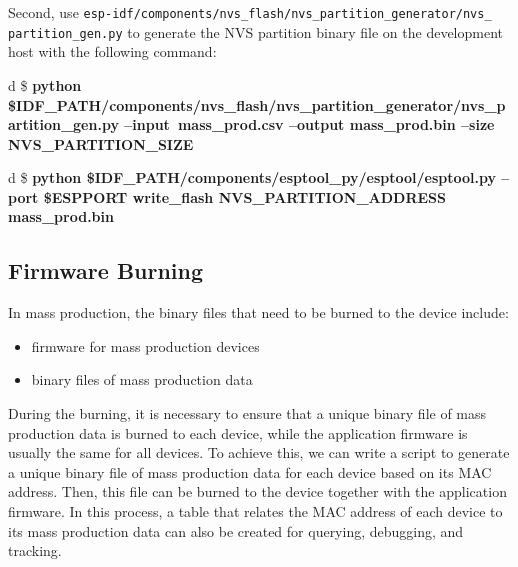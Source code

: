 \documentclass[a4paper,12pt]{book}
\begin{document}
Second, use \texttt{esp-idf/components/nvs\_flash/nvs\_partition\_generator/nvs\_\\
partition\_gen.py} to generate the NVS partition binary file on the development host with the following command:

\begin{codebloc}
\begin{tabular}{d}
\$ \bfseries python \$IDF\_PATH/components/nvs\_flash/nvs\_partition\_generator/nvs\_partition\_\newline gen.py --input\ mass\_prod.csv --output mass\_prod.bin --size NVS\_PARTITION\_SIZE
\end{tabular}
\end{codebloc}


\begin{codebloc}
\begin{tabular}{d}
\$ \bfseries python \$IDF\_PATH/components/esptool\_py/esptool/esptool.py --port \$ESPPORT write\_flash NVS\_PARTITION\_ADDRESS mass\_prod.bin
\end{tabular}
\end{codebloc}


\subsection{Firmware Burning}

In mass production, the binary files that need to be burned to the device include:

\begin{itemize}
    \leftskip 1em
    \item firmware for mass production devices
    \setlength{\parskip}{0pt}
    \item binary files of mass production data
\end{itemize}

During the burning, it is necessary to ensure that a unique binary file of mass production data is burned to each device, while the application firmware is usually the same for all devices. To achieve this, we can write a script to generate a unique binary file of mass production data for each device based on its MAC address. Then, this file can be burned to the device together with the application firmware. In this process, a table that relates the MAC address of each device to its mass production data can also be created for querying, debugging, and tracking.
\end{document}
